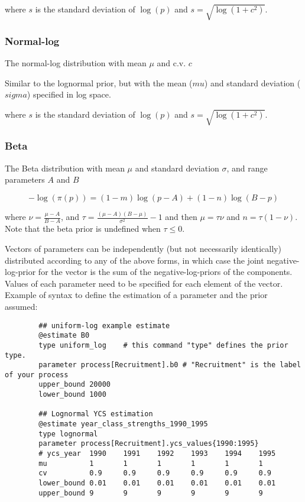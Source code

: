 where $s$ is the standard deviation of $\log(p)$ and $s= \sqrt{\log \left(1+c^2 \right)}$.

\subsubsection{Normal-log}\label{sec:Prior-NormalLog}

The normal-log distribution  with mean $\mu$ and c.v. $c$

Similar to the lognormal prior, but with the mean ($mu$) and standard deviation ($sigma$) specified in log space.

where $s$ is the standard deviation of $\log(p)$ and $s= \sqrt{\log \left(1+c^2 \right)}$.


\subsubsection{Beta}\label{sec:Prior-Beta}

The Beta distribution with mean $\mu$ and standard deviation $\sigma$, and range parameters $A$ and $B$

\begin{equation}
 - \log \left(\pi \left( p \right) \right) = \left( 1 - m \right) \log \left( p - A \right) + \left( 1 - n \right)\log \left( B - p \right)
\end{equation}

where $\nu  = \frac{\mu  - A}{B - A}$, and $\tau = \frac{\left(\mu -A \right)\left(B - \mu \right)}{\sigma ^2} - 1$ and then $\mu=\tau \nu$ and $n=\tau(1-\nu)$. Note that the beta prior is undefined when $\tau \leq 0$.

Vectors of parameters can be independently (but not necessarily identically) distributed according to any of the above forms, in which case the joint negative-log-prior for the vector is the sum of the negative-log-priors of the components. Values of each parameter need to be specified for each element of the vector. Example of syntax to define the estimation of a parameter and the prior assumed:

{\small{\begin{verbatim}
		## uniform-log example estimate
		@estimate B0
		type uniform_log	# this command "type" defines the prior type.
		parameter process[Recruitment].b0 # "Recruitment" is the label of your process
		upper_bound 20000
		lower_bound 1000

		## Lognormal YCS estimation
		@estimate year_class_strengths_1990_1995
		type lognormal
		parameter process[Recruitment].ycs_values{1990:1995}
		# ycs_year  1990	1991	1992	1993	1994	1995
		mu   		1   	1   	1   	1   	1   	1
		cv 			0.9 	0.9 	0.9 	0.9 	0.9 	0.9
		lower_bound 0.01	0.01	0.01	0.01	0.01	0.01
		upper_bound 9		9		9		9		9		9
\end{verbatim}}}

